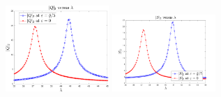 \documentclass[11pt]{article}
\begin{document}
\begin{figure}[H]
	\centering
	\subfigure 
	{\includegraphics[width=0.35\textwidth]
		{fig_LGSPR_IIO_Qu_shift_cos4_gbar1000_VACUUM_ALMA.pdf}}
	\quad
	\subfigure 
	{\includegraphics[width=0.35\textwidth]
		{fig_LGSPR_IIO_Sw_shift_cos4_gbar1000_VACUUM_ALMA.pdf}}
\end{figure}
\end{document}
